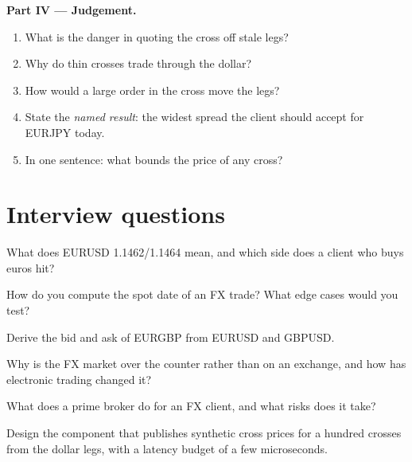 \begin{problem}
\medskip\noindent\textbf{Part IV --- Judgement.}
\begin{enumerate}[resume]
\item What is the danger in quoting the cross off stale legs?
\item Why do thin crosses trade through the dollar?
\item How would a large order in the cross move the legs?
\item State the \emph{named result}: the widest spread the client should accept
for EURJPY today.
\item In one sentence: what bounds the price of any cross?
\end{enumerate}
\end{problem}

\section{Interview questions}

\begin{interviewq}\label{iq:m2:the-fx-market:1}
What does EURUSD 1.1462/1.1464 mean, and which side does a client who buys euros
hit?
\end{interviewq}

\begin{interviewq}\label{iq:m2:the-fx-market:2}
How do you compute the spot date of an FX trade? What edge cases would you test?
\end{interviewq}

\begin{interviewq}\label{iq:m2:the-fx-market:3}
Derive the bid and ask of EURGBP from EURUSD and GBPUSD.
\end{interviewq}

\begin{interviewq}\label{iq:m2:the-fx-market:4}
Why is the FX market over the counter rather than on an exchange, and how has
electronic trading changed it?
\end{interviewq}

\begin{interviewq}\label{iq:m2:the-fx-market:5}
What does a prime broker do for an FX client, and what risks does it take?
\end{interviewq}

\begin{interviewq}\label{iq:m2:the-fx-market:6}
Design the component that publishes synthetic cross prices for a hundred
crosses from the dollar legs, with a latency budget of a few microseconds.
\end{interviewq}
